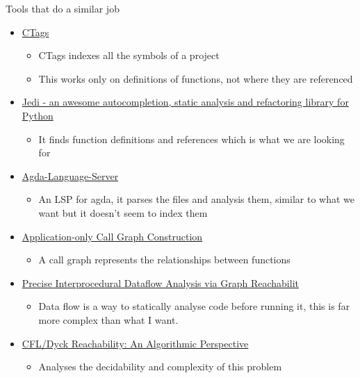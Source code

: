 Tools that do a similar job
\begin{itemize}
\item \href{https://github.com/universal-ctags/ctags}{CTags}
    \begin{itemize}
    \item CTags indexes all the symbols of a project
    \item This works only on definitions of functions, not where they are referenced
    \end{itemize}
\item \href{https://jedi.readthedocs.io/}{Jedi - an awesome autocompletion, static analysis and refactoring library for Python}
    \begin{itemize}
    \item It finds function definitions and references which is what we are looking
        for
    \end{itemize}
\item \href{https://github.com/agda/agda-language-server/tree/master}{Agda-Language-Server}
    \begin{itemize}
    \item An LSP for agda, it parses the files and analysis them, similar to what we
        want but it doesn't seem to index them
    \end{itemize}
\item \href{https://cormack.uwaterloo.ca/~olhotak/pubs/ecoop12.pdf}{Application-only Call Graph Construction }
    \begin{itemize}
    \item A call graph represents the relationships between functions
    \end{itemize}
\item \href{https://dl.acm.org/doi/pdf/10.1145/199448.199462}{Precise Interprocedural Dataflow Analysis via Graph Reachabilit}
    \begin{itemize}
    \item Data flow is a way to statically analyse code before running it, this is
        far more complex than what I want.
    \end{itemize}
\item \href{https://dl.acm.org/doi/abs/10.1145/3583660.3583664}{CFL/Dyck Reachability: An Algorithmic Perspective}
    \begin{itemize}
    \item Analyses the decidability and complexity of this problem
    \end{itemize}
\end{itemize}
